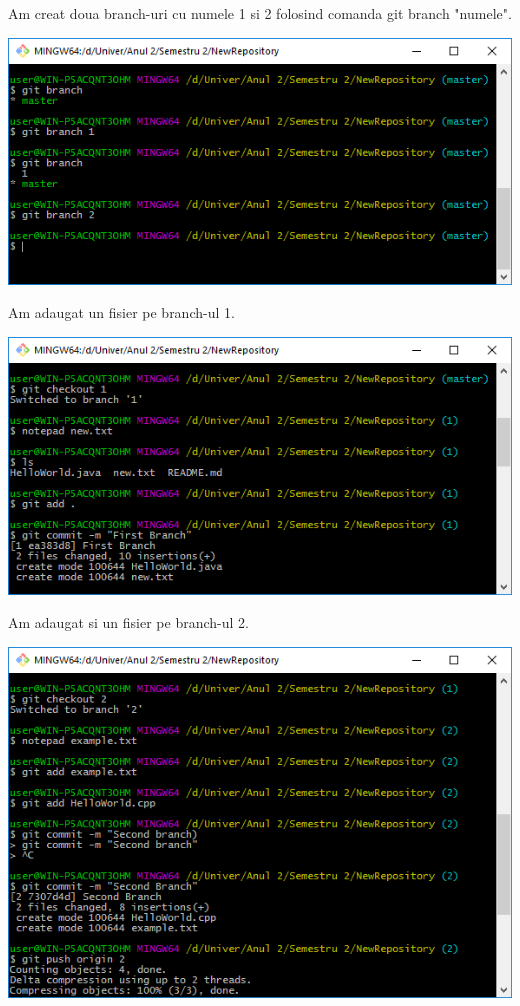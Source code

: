 Am creat doua branch-uri cu numele 1 si 2 folosind comanda git branch "numele".\\
\begin{center}
\includegraphics[scale=0.75]{images/7}\\
\end{center}

Am adaugat un fisier pe branch-ul 1.\\
\begin{center}
\includegraphics[scale=0.75]{images/9}\\
\end{center}

Am adaugat si un fisier pe branch-ul 2.\\
\begin{center}
\includegraphics[scale=0.75]{images/10}\\
\end{center}

